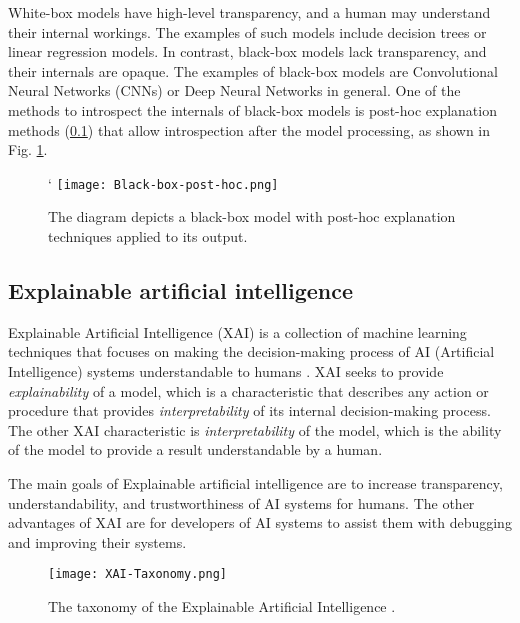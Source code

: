 \documentclass[
    bindingoffset=5mm,  %
    footnoteindent=3mm, %
    hyphenation=true    %
]{src/wut-thesis}
\begin{document}
White-box models have high-level transparency, and a human may understand their internal workings.
The examples of such models include decision trees or linear
regression models. In contrast, black-box models lack transparency, and their internals are opaque. The examples
of black-box models are Convolutional Neural Networks (CNNs) or Deep Neural Networks in general. One of the methods
to introspect the internals of black-box models is post-hoc explanation methods (\ref{ch2:Xai}) that allow
introspection after the model processing, as shown in Fig. \ref{fig:BlackBoxModel}.

\begin{figure}[h!] %
    \centering`
    \texttt{[image: Black-box-post-hoc.png]}
    \caption{The diagram depicts a black-box model with post-hoc explanation techniques applied to its output.}
    \label{fig:BlackBoxModel}
\end{figure}

\subsection{Explainable artificial intelligence} \label{ch2:Xai}

Explainable Artificial Intelligence (XAI) is a collection of machine learning
techniques that focuses on making the decision-making process
of AI (Artificial Intelligence) systems understandable to humans \cite{Arrieta2019-yr}.
XAI seeks to provide \emph{explainability} of a model, which is a characteristic
that describes any action or procedure that provides \emph{interpretability} of its
internal decision-making process. The other XAI characteristic is \emph{interpretability} of the model, which is
the ability of the model to provide a result understandable by a human. 

The main goals of Explainable artificial intelligence are to increase transparency, understandability,
and trustworthiness of AI systems for humans. The other advantages of XAI are for developers of AI systems
to assist them with debugging and improving their systems.

\begin{figure}[h!] %
    \centering
    \texttt{[image: XAI-Taxonomy.png]}
    \caption{The taxonomy of the Explainable Artificial Intelligence \cite{Patricio2022}.}
    \label{fig:XaiTaxonomy}
\end{figure}
 
\end{document}
